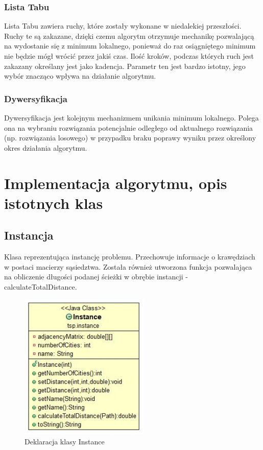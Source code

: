 \documentclass[a4paper,11pt]{article}
\begin{document}
\subsubsection{Lista Tabu}

Lista Tabu zawiera ruchy, które zostały wykonane w niedalekiej przeszłości. Ruchy te są zakazane, dzięki czemu algorytm otrzymuje mechanikę pozwalającą na wydostanie się z minimum lokalnego, ponieważ do raz osiągniętego minimum nie będzie mógł wrócić przez jakiś czas. Ilość kroków, podczas których ruch jest zakazany określany jest jako kadencja. Parametr ten jest bardzo istotny, jego wybór znacząco wpływa na działanie algorytmu.
\subsubsection{Dywersyfikacja}

Dywersyfikacja jest kolejnym mechanizmem unikania minimum lokalnego. Polega ona na wybraniu rozwiązania potencjalnie odległego od aktualnego rozwiązania (np. rozwiązania losowego) w przypadku braku poprawy wyniku przez określony okres działania algorytmu.

\newpage
\section{Implementacja algorytmu, opis istotnych klas}
\subsection{Instancja}

Klasa reprezentująca instancję problemu. Przechowuje informacje o krawędziach w postaci macierzy sąsiedztwa. Została również utworzona funkcja pozwalająca na obliczenie długości podanej ścieżki w obrębie instancji - calculateTotalDistance.

\begin{figure}[H]
\centering
\includegraphics[height=7cm]{ClassInstance.JPG}
\caption{Deklaracja klasy Instance}
\end{figure}
\end{document}
